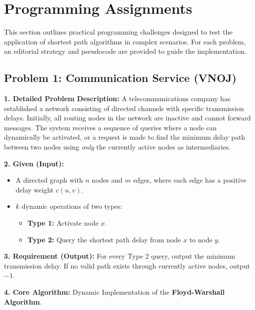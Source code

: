 \section{Programming Assignments}

\label{sec:prog_assignments}

This section outlines practical programming challenges designed to test the application of shortest path algorithms in complex scenarios. For each problem, an editorial strategy and pseudocode are provided to guide the implementation.

\subsection{Problem 1: Communication Service (VNOJ)}

\textbf{1. Detailed Problem Description:}
A telecommunications company has established a network consisting of directed channels with specific transmission delays. Initially, all routing nodes in the network are inactive and cannot forward messages. The system receives a sequence of queries where a node can dynamically be activated, or a request is made to find the minimum delay path between two nodes using \textit{only} the currently active nodes as intermediaries. 

\textbf{2. Given (Input):}
\begin{itemize}
    \item A directed graph with $n$ nodes and $m$ edges, where each edge has a positive delay weight $c(u, v)$.
    \item $k$ dynamic operations of two types:
    \begin{itemize}
        \item \textbf{Type 1:} Activate node $x$.
        \item \textbf{Type 2:} Query the shortest path delay from node $x$ to node $y$.
    \end{itemize}
\end{itemize}

\textbf{3. Requirement (Output):}
For every Type 2 query, output the minimum transmission delay. If no valid path exists through currently active nodes, output $-1$.

\textbf{4. Core Algorithm:} 
Dynamic Implementation of the \textbf{Floyd-Warshall Algorithm}.

